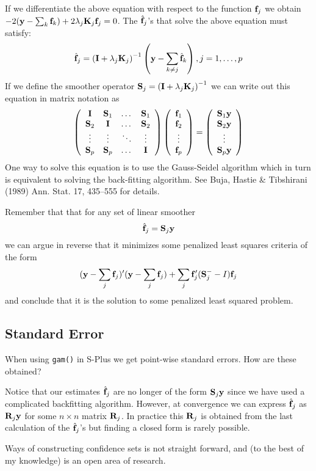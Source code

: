 If we differentiate the above equation with respect to the function
${\mathbf f}_j$ we obtain $-2({\mathbf y} - \sum_k {\mathbf f}_k) + 2 \lambda_j {\mathbf K}_j {\mathbf f}_j =
0$. The $\hat{{\mathbf f}}_j$'s that solve the above equation must satisfy:
\[
\hat{{\mathbf f}}_j = \left({\mathbf I} + \lambda_j {\mathbf K}_j\right)^{-1}\left({\mathbf y} -
\sum_{k\neq j} \hat{{\mathbf f}}_k\right), j=1,\dots,p 
\]
If we define the smoother operator ${\mathbf S}_j = \left({\mathbf I} + \lambda_j
{\mathbf K}_j\right)^{-1}$ we can write out this equation in matrix notation as
\[
\left(
\begin{array}{cccc}
{\mathbf I}&{\mathbf S}_1&\dots&{\mathbf S}_1\\
{\mathbf S}_2&{\mathbf I}&\dots&{\mathbf S}_2\\
\vdots&\vdots&\ddots&\vdots\\
{\mathbf S}_p&{\mathbf S}_p&\dots&{\mathbf I}
\end{array}
\right)
\left(
\begin{array}{c}
{\mathbf f}_1\\
{\mathbf f}_2\\
\vdots\\
{\mathbf f}_p
\end{array}
\right)
=
\left(
\begin{array}{c}
{\mathbf S}_1 {\mathbf y}\\
{\mathbf S}_2 {\mathbf y}\\
\vdots\\
{\mathbf S}_p {\mathbf y}
\end{array}
\right)
\]
One way to solve this equation is to use the Gauss-Seidel algorithm
which in turn is  equivalent to
solving the back-fitting algorithm. See Buja, Hastie \& Tibshirani
(1989) Ann. Stat. 17, 435--555 for details.

Remember that 
 that for any set of linear smoother
\[
\hat{{\mathbf f}}_j = {\mathbf S}_j{\mathbf y}
\]
we can argue in reverse that it minimizes some penalized least squares
criteria of the form
\[
({\mathbf y} - \sum_j{\mathbf f}_j)'({\mathbf y} - \sum_j{\mathbf f}_j) + \sum_j {\mathbf f}_j'({\mathbf S}_j^{-} - I){\mathbf f}_j
\]
and conclude that it is the solution to some penalized least squared
problem.

\subsection{Standard Error}
When using {\tt gam()} in S-Plus we get point-wise standard
errors. How are these obtained?

Notice that our estimates 
$\hat{{\mathbf f}}_j$ are no longer of the form ${\mathbf S}_j {\mathbf y}$ since we have used a
complicated backfitting algorithm. However, at convergence we can
express $\hat{{\mathbf f}}_j$ as ${\mathbf R}_j {\mathbf y}$ for some $n \times n$ matrix
${\mathbf R}_j$. In practice this ${\mathbf R}_j$ is obtained from the last calculation
of the $\hat{{\mathbf f}}_j$'s but finding a closed form is rarely
possible. 

Ways of constructing confidence sets is not straight forward, and (to the best
of my knowledge) is an open area of research.




